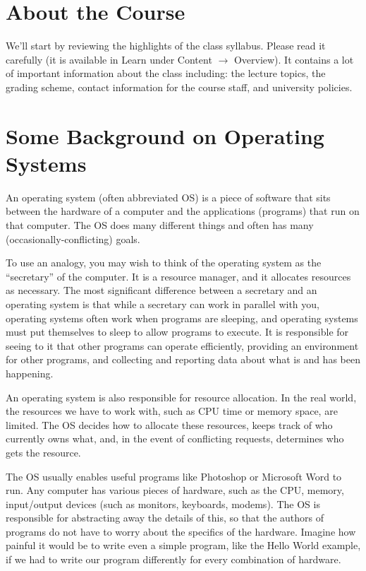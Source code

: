 




\section*{About the Course}
We'll start by reviewing the highlights of the class syllabus. Please read it carefully (it is available in Learn under Content $\rightarrow$ Overview). It contains a lot of important information about the class including: the lecture topics, the grading scheme, contact information for the course staff, and university policies.

\section*{Some Background on Operating Systems}

An operating system (often abbreviated OS) is a piece of software that sits between the hardware of a computer and the applications (programs) that run on that computer. The OS does many different things and often has many (occasionally-conflicting) goals. 

To use an analogy, you may wish to think of the operating system as the ``secretary'' of the computer.  It is a resource manager, and it allocates resources as necessary.  The most significant difference between a secretary and an operating system is that while a secretary can work in parallel with you, operating systems often work when programs are sleeping, and operating systems must put themselves to sleep to allow programs to execute. It is responsible for seeing to it that other programs can operate efficiently, providing an environment for other programs, and collecting and reporting data about what is and has been happening.

An operating system is also responsible for resource allocation. In the real world, the resources we have to work with, such as CPU time or memory space, are limited. The OS decides how to allocate these resources, keeps track of who currently owns what, and, in the event of conflicting requests, determines who gets the resource.

The OS usually enables useful programs like Photoshop or Microsoft Word to run. Any computer has various pieces of hardware, such as the CPU, memory, input/output devices (such as monitors, keyboards, modems). The OS is responsible for abstracting away the details of this, so that the authors of programs do not have to worry about the specifics of the hardware. Imagine how painful it would be to write even a simple program, like the Hello World example, if we had to write our program differently for every combination of hardware.

